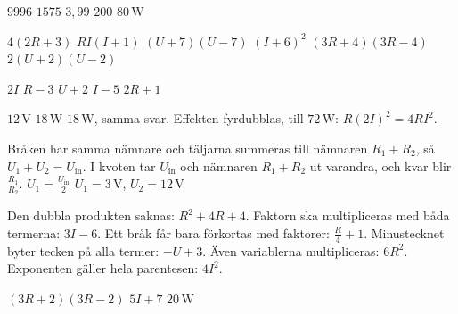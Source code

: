 \begin{facit}
  $9996$  $1575$  $3{,}99$  $200$  $80\,\text{W}$

  $4(2R + 3)$  $RI(I + 1)$  $(U + 7)(U - 7)$  $(I + 6)^2$
 $(3R + 4)(3R - 4)$  $2(U + 2)(U - 2)$

  $2I$  $R - 3$  $U + 2$  $I - 5$  $2R + 1$

  $12\,\text{V}$  $18\,\text{W}$  $18\,\text{W}$, samma svar.
 Effekten fyrdubblas, till $72\,\text{W}$: $R(2I)^2 = 4RI^2$.

  Bråken har samma nämnare och täljarna summeras till nämnaren $R_1 + R_2$, så
$U_1 + U_2 = U_{\text{in}}$.
 I kvoten tar $U_{\text{in}}$ och nämnaren $R_1 + R_2$ ut varandra, och kvar blir
$\frac{R_1}{R_2}$.  $U_1 = \frac{U_{\text{in}}}{2}$
 $U_1 = 3\,\text{V}$, $U_2 = 12\,\text{V}$

  Den dubbla produkten saknas: $R^2 + 4R + 4$.
 Faktorn ska multipliceras med båda termerna: $3I - 6$.
 Ett bråk får bara förkortas med faktorer: $\frac{R}{4} + 1$.
 Minustecknet byter tecken på alla termer: $-U + 3$.
 Även variablerna multipliceras: $6R^2$.
 Exponenten gäller hela parentesen: $4I^2$.

  $(3R + 2)(3R - 2)$  $5I + 7$
 $20\,\text{W}$

\end{facit}
